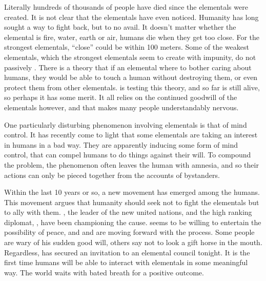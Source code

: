 \documentclass[blue]{elementals}
\begin{document}
Literally hundreds of thousands of people have died since the elementals were created. It is not clear that the elementals have even noticed. Humanity has long sought a way to fight back, but to no avail. It doesn't matter whether the elemental is fire, water, earth or air, humans die when they get too close. For the strongest elementals, ``close'' could be within 100 meters. Some of the weakest elementals, which the strongest elementals seem to create with impunity, do not passively . There is a theory that if an elemental where to bother caring about humans, they would be able to touch a human without destroying them, or even protect them from other elementals. \cDiplomat{} is testing this theory, and so far is still alive, so perhaps it has some merit. It all relies on the continued goodwill of the elementals however, and that makes many people understandably nervous.

One particularly disturbing phenomenon involving elementals is that of mind control. It has recently come to light that some elementals are taking an interest in humans in a bad way. They are apparently inducing some form of mind control, that can compel humans to do things against their will. To compound the problem, the phenomenon often leaves the human with amnesia, and so their actions can only be pieced together from the accounts of bystanders.

Within the last 10 years or so, a new movement has emerged among the humans. This movement argues that humanity should seek not to fight the elementals but to ally with them. \cLeader{}, the leader of the new united nations, and the high ranking diplomat, \cAvatar{}, have been championing the cause. \cAirKing{} seems to be willing to entertain the possibility of peace, and \cLeader{} and \cAvatar{} are moving forward with the process. Some people are wary of his sudden good will, others say not to look a gift horse in the mouth. Regardless, \cLeader{} has secured an invitation to an elemental council tonight. It is the first time humans will be able to interact with elementals in some meaningful way. The world waits with bated breath for a positive outcome.

\end{document}
